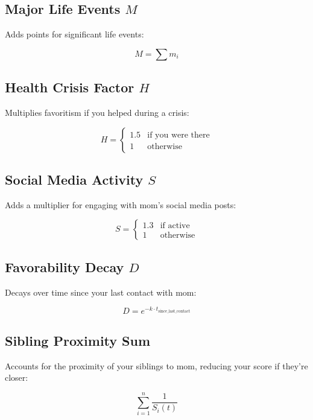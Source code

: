 \documentclass[12pt]{article}
\begin{document}
\subsection{Major Life Events $M$}
Adds points for significant life events:

\begin{equation}
M = \sum m_i
\end{equation}

\subsection{Health Crisis Factor $H$}
Multiplies favoritism if you helped during a crisis:

\begin{equation}
H = \begin{cases}
1.5 & \text{if you were there} \\
1 & \text{otherwise}
\end{cases}
\end{equation}

\subsection{Social Media Activity $S$}
Adds a multiplier for engaging with mom’s social media posts:

\begin{equation}
S = \begin{cases}
1.3 & \text{if active} \\
1 & \text{otherwise}
\end{cases}
\end{equation}

\subsection{Favorability Decay $D$}
Decays over time since your last contact with mom:

\begin{equation}
D = e^{-k \cdot t_{\text{since\_last\_contact}}}
\end{equation}

\subsection{Sibling Proximity Sum}
Accounts for the proximity of your siblings to mom, reducing your score if they’re closer:

\begin{equation}
\sum_{i=1}^{n} \frac{1}{S_i(t)}
\end{equation}
\end{document}
